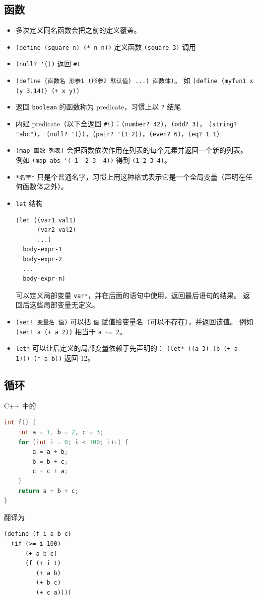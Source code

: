 \subsection{函数}
\begin{itemize}
\item 多次定义同名函数会把之前的定义覆盖。
\item \verb`(define (square n) (* n n))` 定义函数 \verb`(square 3)` 调用
\item \verb`(null? '())` 返回 \verb`#t`
\item \verb`(define (函数名 形参1 (形参2 默认值) ...) 函数体)`。 如 \verb`(define (myfun1 x (y 3.14)) (+ x y))`
\item 返回 \verb`boolean` 的函数称为 predicate，习惯上以 \verb`?` 结尾
\item 内建 predicate（以下全返回 \verb`#t`）：\verb`(number? 42)`，\verb`(odd? 3)`， \verb`(string? "abc")`， \verb`(null? '())`，\verb`(pair? '(1 2))`，\verb`(even? 6)`，\verb`(eq? 1 1)`
\item \verb`(map 函数 列表)` 会把函数依次作用在列表的每个元素并返回一个新的列表。 例如 \verb`(map abs '(-1 -2 3 -4))` 得到 \verb`(1 2 3 4)`。
\item \verb`*名字*` 只是个普通名字，习惯上用这种格式表示它是一个全局变量（声明在任何函数体之外）。
\item \verb`let` 结构
\begin{lstlisting}[language=none]
(let ((var1 val1)
      (var2 val2)
      ...)
  body-expr-1
  body-expr-2
  ...
  body-expr-n)
\end{lstlisting}
可以定义局部变量 \verb`var*`，并在后面的语句中使用，返回最后语句的结果。 返回后这些局部变量无定义。
\item \verb`(set! 变量名 值)` 可以把 \verb`值` 赋值给变量名（可以不存在），并返回该值。 例如 \verb`(set! a (+ a 2))` 相当于 \verb`a += 2`。
\item \verb`let*` 可以让后定义的局部变量依赖于先声明的： \verb`(let* ((a 3) (b (+ a 1))) (* a b))` 返回 12。
\end{itemize}


\subsection{循环}
C++ 中的
\begin{lstlisting}[language=cpp]
int f() {
    int a = 1, b = 2, c = 3;
    for (int i = 0; i < 100; i++) {
        a = a + b;
        b = b + c;
        c = c + a;
    }
    return a + b + c;
}
\end{lstlisting}
翻译为
\begin{lstlisting}[language=none]
(define (f i a b c)
  (if (>= i 100)
      (+ a b c)
      (f (+ i 1)
         (+ a b)
         (+ b c)
         (+ c a))))
\end{lstlisting}
